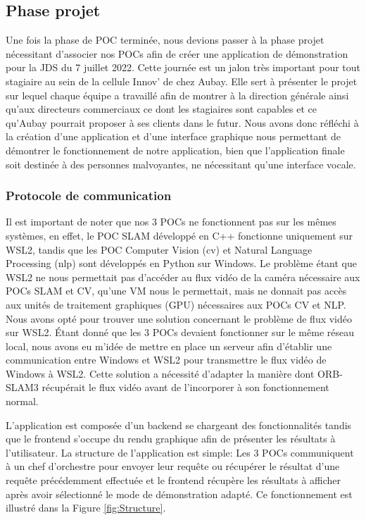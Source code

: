 \documentclass[11pt]{article}
\begin{document}
    \subsection{Phase projet}
      Une fois la phase de POC terminée, nous devions passer à la phase projet nécessitant d'associer nos POCs
      afin de créer une application de démonstration pour la JDS du 7 juillet 2022. Cette journée est un jalon très important
      pour tout stagiaire au sein de la cellule Innov' de chez Aubay. Elle sert à présenter le projet sur lequel chaque équipe a travaillé
      afin de montrer à la direction générale ainsi qu'aux directeurs commerciaux ce dont les stagiaires sont capables et ce qu'Aubay pourrait
      proposer à ses clients dans le futur. Nous avons donc réfléchi à la création d'une application et d'une
      interface graphique nous permettant de démontrer le fonctionnement de notre application, bien que l'application finale soit destinée 
      à des personnes malvoyantes, ne nécessitant qu'une interface vocale.

      \subsubsection{Protocole de communication}
        Il est important de noter que nos 3 POCs ne fonctionnent pas sur les mêmes systèmes, en effet, le POC SLAM développé en C++
        fonctionne uniquement sur WSL2, tandis que les POC Computer Vision (\acrshort{cv}) et Natural Language Processing (\acrshort{nlp}) 
        sont développés en Python sur Windows. Le problème étant que WSL2 ne nous permettait pas d'accéder au flux vidéo de la caméra nécessaire 
        aux POCs SLAM et CV, qu'une VM nous le permettait, mais ne donnait pas accès aux unités de traitement graphiques (GPU) nécessaires aux 
        POCs CV et NLP. Nous avons opté pour 
        trouver une solution concernant le problème de flux vidéo sur WSL2. Étant donné que les 3 POCs devaient fonctionner sur le même réseau 
        local, nous avons eu m'idée de mettre en place un serveur afin d'établir une communication entre Windows et WSL2 pour transmettre le flux 
        vidéo de Windows à WSL2. Cette solution a nécessité d'adapter la manière dont ORB-SLAM3 récupérait le flux vidéo avant de l'incorporer à 
        son fonctionnement normal.

        L'application est composée d'un backend se chargeant des fonctionnalités tandis que le frontend s'occupe du rendu
        graphique afin de présenter les résultats à l'utilisateur. La structure de l'application est simple: Les 3 POCs communiquent à un 
        chef d'orchestre pour envoyer leur requête ou récupérer le résultat d'une requête précédemment effectuée et le frontend récupère
        les résultats à afficher après avoir sélectionné le mode de démonstration adapté. Ce fonctionnement est illustré dans la 
        Figure \ref{fig:Structure}.
\end{document}

